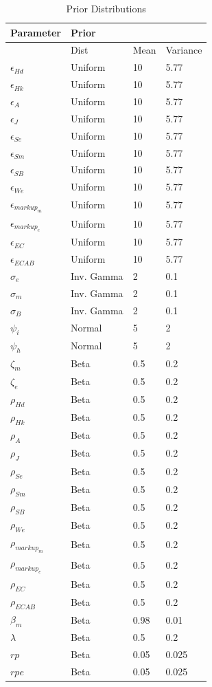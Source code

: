 \documentclass[12pt]{article}
\numberwithin{equation}{section}
\begin{document}
 
\begin{table}[H]
\caption{Prior Distributions}
\label{prior_dist_table}
\begin{tabular}{l|l|l|l}
Parameter & Prior &  &  \\
\hline
\hline
 & Dist & Mean & Variance \\
 \hline
\hline
$\epsilon_{Hd}$ & Uniform & 10 & 5.77 \\
$\epsilon_{Hk}$ & Uniform & 10 & 5.77 \\
$\epsilon_{A}$ & Uniform & 10 & 5.77 \\
$\epsilon_{J}$ & Uniform & 10 & 5.77 \\
$\epsilon_{Se}$ & Uniform & 10 & 5.77 \\
$\epsilon_{Sm}$ & Uniform & 10 & 5.77 \\
$\epsilon_{SB}$ & Uniform & 10 & 5.77 \\
$\epsilon_{We}$ & Uniform & 10 & 5.77 \\
$\epsilon_{markup_m}$ & Uniform & 10 & 5.77 \\
$\epsilon_{markup_e}$ & Uniform & 10 & 5.77 \\
$\epsilon_{EC}$ & Uniform & 10 & 5.77 \\
$\epsilon_{ECAB}$ & Uniform & 10 & 5.77 \\
$\sigma_e$ & Inv. Gamma & 2 & 0.1 \\
$\sigma_m$ & Inv. Gamma & 2 & 0.1 \\
$\sigma_B$ & Inv. Gamma & 2 & 0.1 \\
$\psi_i$ & Normal & 5 & 2 \\
$\psi_h$ & Normal & 5 & 2 \\
$\zeta_m$ & Beta & 0.5 & 0.2 \\
$\zeta_e$ & Beta & 0.5 & 0.2 \\
$\rho_{Hd}$ & Beta & 0.5 & 0.2 \\
$\rho_{Hk}$ & Beta & 0.5 & 0.2 \\
$\rho_{A}$ & Beta & 0.5 & 0.2 \\
$\rho_{J}$ & Beta & 0.5 & 0.2 \\
$\rho_{Se}$ & Beta & 0.5 & 0.2 \\
$\rho_{Sm}$ & Beta & 0.5 & 0.2 \\
$\rho_{SB}$ & Beta & 0.5 & 0.2 \\
$\rho_{We}$ & Beta & 0.5 & 0.2 \\
$\rho_{markup_m}$ & Beta & 0.5 & 0.2 \\
$\rho_{markup_e}$ & Beta & 0.5 & 0.2 \\
$\rho_{EC}$ & Beta & 0.5 & 0.2 \\
$\rho_{ECAB}$ & Beta & 0.5 & 0.2 \\
$\beta_m$ 	  &   Beta   &  0.98   & 0.01    \\
$\lambda$ 	  &  Beta    &   0.5  &   0.2  \\
$rp$ 	  &   Beta   &   0.05  &   0.025  \\
$rpe$ 	  &   Beta   &   0.05  &   0.025  \\
\end{tabular}
\end{table}
\end{document}
